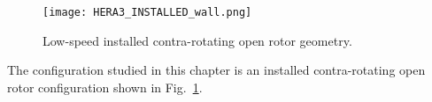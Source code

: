 
\begin{figure}
  \centering
  \texttt{[image: HERA3\_INSTALLED\_wall.png]}
  \caption{Low-speed installed contra-rotating open rotor geometry.}
  \label{fig:HERA3_INSTALLED_wall}
\end{figure}

The configuration studied in this chapter is an 
installed contra-rotating open rotor configuration shown
in Fig.~\ref{fig:HERA3_INSTALLED_wall}.
